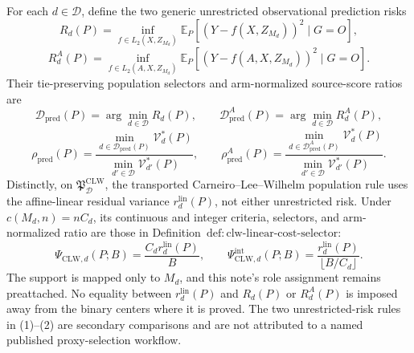 For each \(d\in\mathcal D\), define the two generic unrestricted observational prediction risks
\[
 R_d(P)=\inf_{f\in L_2(X,Z_{M_d})}
 \mathbb E_P[(Y-f(X,Z_{M_d}))^2\mid G=O],
\]
\[
 R_d^A(P)=\inf_{f\in L_2(A,X,Z_{M_d})}
 \mathbb E_P[(Y-f(A,X,Z_{M_d}))^2\mid G=O].                \tag{1}
\]
Their tie-preserving population selectors and arm-normalized source-score ratios are
\[
 \mathcal D_{\mathrm{pred}}(P)=\arg\min_{d\in\mathcal D}R_d(P),
 \qquad
 \mathcal D_{\mathrm{pred}}^A(P)=\arg\min_{d\in\mathcal D}R_d^A(P),
\]
\[
 \rho_{\mathrm{pred}}(P)=
 \frac{\min_{d\in\mathcal D_{\mathrm{pred}}(P)}\mathcal V_d^*(P)}
 {\min_{d'\in\mathcal D}\mathcal V_{d'}^*(P)},
 \qquad
 \rho_{\mathrm{pred}}^A(P)=
 \frac{\min_{d\in\mathcal D_{\mathrm{pred}}^A(P)}\mathcal V_d^*(P)}
 {\min_{d'\in\mathcal D}\mathcal V_{d'}^*(P)}.           \tag{2}
\]
Distinctly, on \(\mathfrak P_{\mathcal D}^{\mathrm{CLW}}\), the transported Carneiro--Lee--Wilhelm population rule uses the affine-linear residual variance \(r_d^{\mathrm{lin}}(P)\), not either unrestricted risk.  Under \(c(M_d,n)=nC_d\), its continuous and integer criteria, selectors, and arm-normalized ratio are those in Definition~\(\mathrm{def{:}clw\text{-}linear\text{-}cost\text{-}selector}\):
\[
 \Psi_{\mathrm{CLW},d}(P;B)=\frac{C_dr_d^{\mathrm{lin}}(P)}{B},
 \qquad
 \Psi_{\mathrm{CLW},d}^{\mathrm{int}}(P;B)
 =\frac{r_d^{\mathrm{lin}}(P)}{\lfloor B/C_d\rfloor}.      \tag{3}
\]
The support is mapped only to \(M_d\), and this note's role assignment remains preattached.  No equality between \(r_d^{\mathrm{lin}}(P)\) and \(R_d(P)\) or \(R_d^A(P)\) is imposed away from the binary centers where it is proved.  The two unrestricted-risk rules in (1)--(2) are secondary comparisons and are not attributed to a named published proxy-selection workflow.